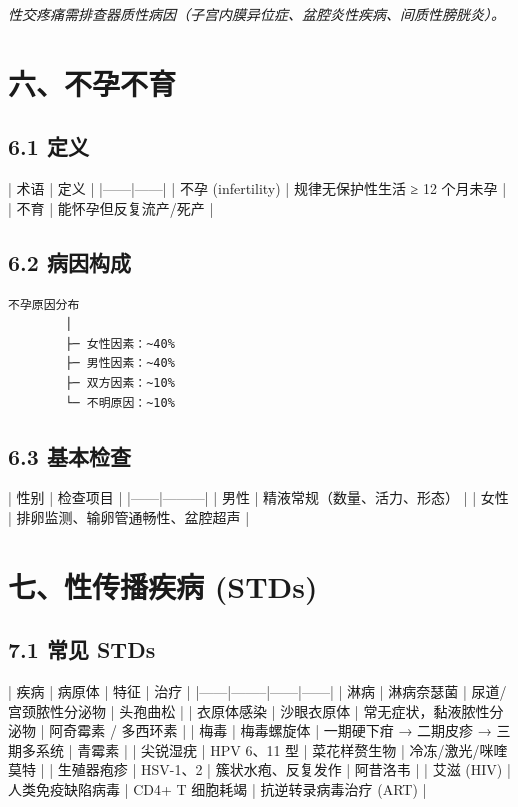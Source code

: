 \documentclass[12pt,UTF8,openany]{ctexbook}
\begin{document}
\emph{性交疼痛需排查器质性病因（子宫内膜异位症、盆腔炎性疾病、间质性膀胱炎）。}

\hrulefill

\section{六、不孕不育}

\subsection{6.1 定义}

| 术语 | 定义 |
|------|------|
| 不孕 (infertility) | 规律无保护性生活 ≥ 12 个月未孕 |
| 不育 | 能怀孕但反复流产/死产 |

\subsection{6.2 病因构成}

\begin{verbatim}
不孕原因分布
        │
        ├─ 女性因素：~40%
        ├─ 男性因素：~40%
        ├─ 双方因素：~10%
        └─ 不明原因：~10%
\end{verbatim}

\subsection{6.3 基本检查}

| 性别 | 检查项目 |
|------|---------|
| 男性 | 精液常规（数量、活力、形态） |
| 女性 | 排卵监测、输卵管通畅性、盆腔超声 |

\hrulefill

\section{七、性传播疾病 (STDs)}

\subsection{7.1 常见 STDs}

| 疾病 | 病原体 | 特征 | 治疗 |
|------|--------|------|------|
| 淋病 | 淋病奈瑟菌 | 尿道/宫颈脓性分泌物 | 头孢曲松 |
| 衣原体感染 | 沙眼衣原体 | 常无症状，黏液脓性分泌物 | 阿奇霉素 / 多西环素 |
| 梅毒 | 梅毒螺旋体 | 一期硬下疳 → 二期皮疹 → 三期多系统 | 青霉素 |
| 尖锐湿疣 | HPV 6、11 型 | 菜花样赘生物 | 冷冻/激光/咪喹莫特 |
| 生殖器疱疹 | HSV-1、2 | 簇状水疱、反复发作 | 阿昔洛韦 |
| 艾滋 (HIV) | 人类免疫缺陷病毒 | CD4+ T 细胞耗竭 | 抗逆转录病毒治疗 (ART) |
\end{document}
